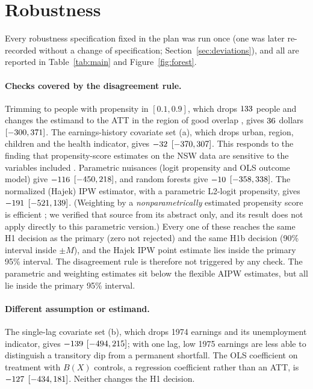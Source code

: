 \documentclass[11pt]{article}
\newcommand{\ci}[2]{$[#1, #2]$}
\begin{document}
\section{Robustness}
\label{sec:robustness}

Every robustness specification fixed in the plan was run once (one was later re-recorded
without a change of specification; Section~\ref{sec:deviations}), and all are reported in
Table~\ref{tab:main} and Figure~\ref{fig:forest}.

\paragraph{Checks covered by the disagreement rule.} Trimming to people with propensity in
$[0.1, 0.9]$, which drops $133$ people and changes the estimand to the ATT in the
region of good overlap \citep{crump2009}, gives $36$ dollars
\ci{\TrimCILow}{\TrimCIHigh}. The earnings-history covariate set (a), which drops urban,
region, children and the health indicator, gives $-32$
\ci{\CovsetACILow}{\CovsetACIHigh}. This responds to the finding that propensity-score
estimates on the NSW data are sensitive to the variables included \citep{smith2005,dehejia2005}.
Parametric nuisances (logit propensity and OLS outcome model) give $-116$
\ci{\LearnerLinearCILow}{\LearnerLinearCIHigh}, and random forests give $-10$
\ci{\LearnerRFCILow}{\LearnerRFCIHigh}. The normalized (Hajek) IPW estimator, with a
parametric L2-logit propensity, gives $-191$ \ci{\IPWCILow}{\IPWCIHigh}. (Weighting
by a \emph{nonparametrically} estimated propensity score is efficient \citep{hirano2003}; we
verified that source from its abstract only, and its result does not apply directly to this
parametric version.) Every one of these reaches
the same H1 decision as the primary (zero not rejected) and the same H1b decision (90\%
interval inside $\pm M$), and the Hajek IPW point estimate lies inside the primary 95\%
interval. The disagreement rule is therefore not triggered by any check. The parametric and
weighting estimates sit below the flexible AIPW estimates, but all lie inside the primary
95\% interval.

\paragraph{Different assumption or estimand.} The single-lag covariate set (b), which drops
1974 earnings and its unemployment indicator, gives $-139$
\ci{\CovsetBCILow}{\CovsetBCIHigh}; with one lag, low 1975 earnings are less able to
distinguish a transitory dip from a permanent shortfall. The OLS coefficient on treatment
with $B(X)$ controls, a regression coefficient rather than an ATT, is $-127$
\ci{\OLSCILow}{\OLSCIHigh}. Neither changes the H1 decision.
\end{document}
